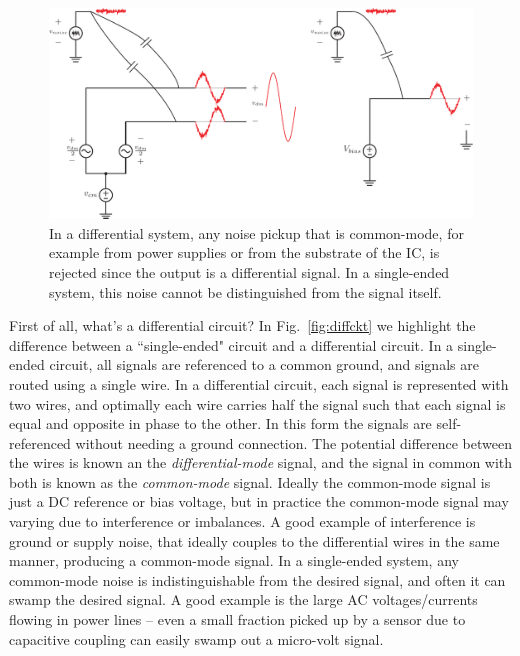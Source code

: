 \begin{figure}[tb]
\begin{center}
\includegraphics[width=0.85\columnwidth]{diff_cm_noise.pdf} 
\end{center}
\caption{In a differential system, any noise pickup that is common-mode, for example from power supplies or from the substrate of the IC, is rejected since the output is a differential signal.  In a single-ended system, this noise cannot be distinguished from the signal itself.} \label{fig:noisereject}
\end{figure}



First of all, what's a differential circuit?  In Fig.~\ref{fig:diffckt} we highlight the difference between a ``single-ended" circuit and a differential circuit. In a single-ended circuit, all signals are referenced to a common ground, and signals are routed using a single wire.  In a differential circuit, each signal is represented with two wires, and optimally each wire carries half the signal such that each signal is equal and opposite in phase to the other.  In this form the signals are self-referenced without needing a ground connection.   The potential difference between the wires is known an the \emph{differential-mode} signal, and the signal in common with both is known as the \emph{common-mode} signal.  Ideally the common-mode signal is just a DC reference or bias voltage, but in practice the common-mode signal may varying due to interference or imbalances.  A good example of interference is ground or supply noise, that ideally couples to the differential wires in the same manner, producing a common-mode signal.  In a single-ended system, any common-mode noise is indistinguishable from the desired signal, and often it can swamp the desired signal.  A good example is the large AC voltages/currents flowing in power lines -- even a small fraction picked up by a sensor due to capacitive coupling can easily swamp out a micro-volt signal.  

